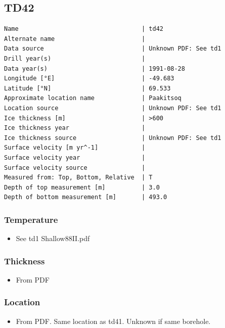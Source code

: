 \documentclass[article,a4paper,times,11pt,twoside]{article}
\begin{document}
\subsection{TD42}
\label{sec:orgcf1f5bd}
\begin{verbatim}
Name                                  | td42
Alternate name                        | 
Data source                           | Unknown PDF: See td1
Drill year(s)                         | 
Data year(s)                          | 1991-08-28
Longitude [°E]                        | -49.683
Latitude [°N]                         | 69.533
Approximate location name             | Paakitsoq
Location source                       | Unknown PDF: See td1
Ice thickness [m]                     | >600
Ice thickness year                    | 
Ice thickness source                  | Unknown PDF: See td1
Surface velocity [m yr^-1]            | 
Surface velocity year                 | 
Surface velocity source               | 
Measured from: Top, Bottom, Relative  | T
Depth of top measurement [m]          | 3.0
Depth of bottom measurement [m]       | 493.0
\end{verbatim}

\subsubsection{Temperature}
\label{sec:org1dca937}

\begin{itemize}
\item See td1 Shallow88II.pdf
\end{itemize}

\subsubsection{Thickness}
\label{sec:orgd36b4a7}

\begin{itemize}
\item From PDF
\end{itemize}

\subsubsection{Location}
\label{sec:org3e47ada}

\begin{itemize}
\item From PDF. Same location as td41. Unknown if same borehole.
\end{itemize}
\end{document}
